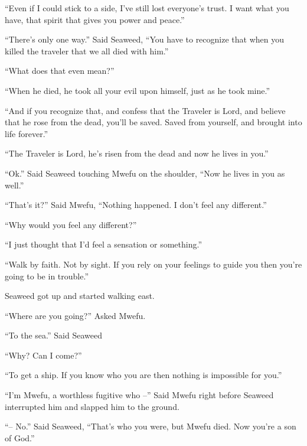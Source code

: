 ``Even if I could stick to a side, I've still lost everyone's trust. I want what you have, that spirit that gives you power and peace.''

``There's only one way.'' Said Seaweed, ``You have to recognize that when you killed the traveler that we all died with him.''

``What does that even mean?''

``When he died, he took all your evil upon himself, just as he took mine.''

``And if you recognize that, and confess that the Traveler is Lord, and believe that he rose from the dead, you'll be saved. Saved from yourself, and brought into life forever.''

``The Traveler is Lord, he's risen from the dead and now he lives in you.''

``Ok.'' Said Seaweed touching Mwe\-fu on the shoulder, ``Now he lives in you as well.''

``That's it?'' Said Mwe\-fu, ``Nothing happened. I don't feel any different.''

``Why would you feel any different?''

``I just thought that I'd feel a sensation or something.''

``Walk by faith. Not by sight. If you rely on your feelings to guide you then you're going to be in trouble.''

Seaweed got up and started walking east.

``Where are you going?'' Asked Mwe\-fu.

``To the sea.'' Said Seaweed

``Why? Can I come?''

``To get a ship. If you know who you are then nothing is impossible for you.''

``I'm Mwefu, a worthless fugitive who --'' Said Mwefu right before 
Seaweed interrupted him and slapped him to the ground.

``-- No.'' Said Seaweed, ``That's who you were, but Mwefu died. Now you're a son of God.''
